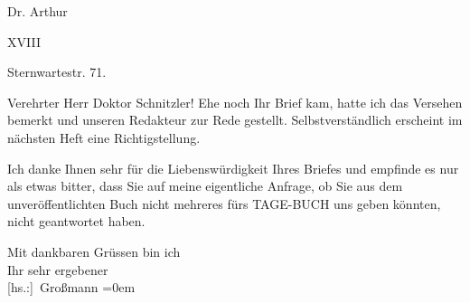 \pstart
           \raggedleft{}Dr. Arthur \pend
           
\pstart
           \raggedleft{} XVIII\pend
           
\pstart
           \raggedleft{}Sternwartestr. 71.\pend
           
\pstart{}Verehrter Herr Doktor Schnitzler!\pend\vspace{0.5em}
\pstart
           Ehe noch Ihr Brief kam, hatte ich das Versehen bemerkt und unseren Redakteur zur Rede gestellt.
               Selbstverständlich erscheint im nächsten Heft eine Richtigstellung.\pend
           
\pstart
           Ich danke Ihnen sehr für die Liebenswürdigkeit Ihres Briefes und empfinde es nur als
               etwas bitter, dass Sie auf meine eigentliche Anfrage, ob Sie aus dem
               unveröffentlichten Buch nicht
               mehreres fürs TAGE-BUCH uns geben könnten, nicht geantwortet haben.\pend
           
\pstart
           Mit dankbaren Grüssen bin ich{\\[\baselineskip]}Ihr sehr ergebener{\\[\baselineskip]}\spacefill\mbox{{[}hs.:{]} Großmann}\pend
           \leftskip=0em{}\endnumbering{}  
      